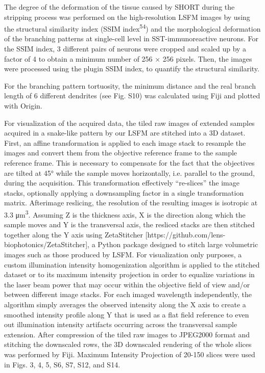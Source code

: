 \documentclass{article}
\begin{document}
The degree of the deformation of the tissue caused by SHORT during the stripping process was performed on the high-resolution LSFM images by using the structural similarity index (SSIM index\textsuperscript{54}) and the morphological deformation of the branching patterns at single-cell level in SST-immunoreactive neurons. For the SSIM index, 3 different pairs of neurons were cropped and scaled up by a factor of 4 to obtain a minimum number of 256 × 256 pixels. Then, the images were processed using the plugin SSIM index, to quantify the structural similarity.

For the branching pattern tortuosity, the minimum distance and the real branch length of 6 different dendrites (see Fig. S10) was calculated using Fiji and plotted with Origin.

For visualization of the acquired data, the tiled raw images of extended samples acquired in a snake-like pattern by our LSFM are stitched into a 3D dataset. First, an affine transformation is applied to each image stack to resample the images and convert them from the objective reference frame to the sample reference frame. This is necessary to compensate for the fact that the objectives are tilted at 45° while the sample moves horizontally, i.e. parallel to the ground, during the acquisition. This transformation effectively “re-slices” the image stacks, optionally applying a downsampling factor in a single transformation matrix. Afterimage reslicing, the resolution of the resulting images is isotropic at 3.3 μm\textsuperscript{3}. Assuming Z is the thickness axis, X is the direction along which the sample moves and Y is the transversal axis, the resliced stacks are then stitched together along the Y axis using ZetaStitcher [https://github.com/lens-biophotonics/ZetaStitcher], a Python package designed to stitch large volumetric images such as those produced by LSFM. For visualization only purposes, a custom illumination intensity homogenization algorithm is applied to the stitched dataset or to its maximum intensity projection in order to equalize variations in the laser beam power that may occur within the objective field of view and/or between different image stacks. For each imaged wavelength independently, the algorithm simply averages the observed intensity along the X axis to create a smoothed intensity profile along Y that is used as a flat field reference to even out illumination intensity artifacts occurring across the transversal sample extension. After compression of the tiled raw images to JPEG2000 format and stitching the downscaled rows, the 3D downscaled rendering of the whole slices was performed by Fiji. Maximum Intensity Projection of 20-150 slices were used in Figs. 3, 4, 5, S6, S7, S12, and S14.
\end{document}
